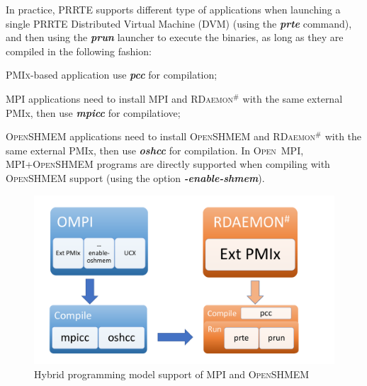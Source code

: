 \documentclass[5p,times,twocolumn]{elsarticle}
\newcommand{\prrte}[0]{\textsc{PRRTE}\xspace}
\newcommand{\pmix}[0]{\textsc{PMIx}\xspace}
\newcommand{\ompi}[0]{\textsc{Open~MPI}\xspace}
\newcommand{\mpi}[0]{\textsc{MPI}\xspace}
\newcommand{\oshmem}[0]{\textsc{OpenSHMEM}\xspace}
\newcommand{\ourwork}[0]{\textsc{RDaemon}\ensuremath{^\#}\xspace}
\begin{document}
In practice, \prrte supports different type of applications when launching a single \prrte Distributed Virtual Machine (DVM) (using the \textbf{\emph{prte}} command), and then using the \textbf{\emph{prun}} launcher to execute the binaries, as long as they are compiled in the following fashion:
\begin{compactenum}
  \item \pmix-based application use \textbf{\emph{pcc}} for compilation;
  \item \mpi applications need to install \mpi and \ourwork with the same external PMIx, then use \textbf{\emph{mpicc}} for compilatiove;
  \item \oshmem applications need to install \oshmem and \ourwork with the same external PMIx, then use \textbf{\emph{oshcc}} for compilation. In \ompi, \mpi+\oshmem programs are directly supported when compiling with \oshmem support (using the option \textbf{\emph{-enable-shmem}}).
\end{compactenum}

\begin{figure}[h]
  \centering
  \includegraphics[width=\linewidth]{prrte_with_oshmem.pdf}\vspace{-1em}
  \caption{Hybrid programming model support of MPI and \oshmem}
  \label{fig:prrte.with.oshmem}
\end{figure}
\end{document}
